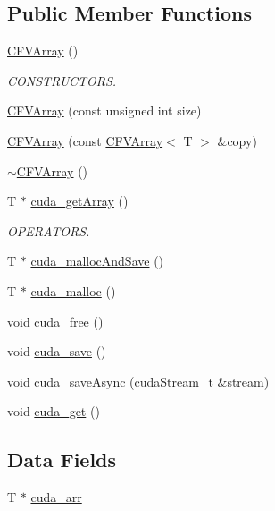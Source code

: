 \subsection*{Public Member Functions}
\begin{DoxyCompactItemize}
\item 
\hyperlink{classFVL_1_1CFVArray_af141a187a6f343f8f0acf258ee9428f5}{CFVArray} ()
\begin{DoxyCompactList}\small\item\em CONSTRUCTORS. \item\end{DoxyCompactList}\item 
\hyperlink{classFVL_1_1CFVArray_a4533252544513e80b44814b8afab3190}{CFVArray} (const unsigned int size)
\item 
\hyperlink{classFVL_1_1CFVArray_a2bfe813d44db8292ff5793db73fe7fe0}{CFVArray} (const \hyperlink{classFVL_1_1CFVArray}{CFVArray}$<$ T $>$ \&copy)
\item 
\hyperlink{classFVL_1_1CFVArray_a3c7cfa5d9c6793cd2866030b734b5987}{$\sim$CFVArray} ()
\item 
T $\ast$ \hyperlink{classFVL_1_1CFVArray_a79c842ffa963500e75bb49038b5a91cf}{cuda\_\-getArray} ()
\begin{DoxyCompactList}\small\item\em OPERATORS. \item\end{DoxyCompactList}\item 
T $\ast$ \hyperlink{classFVL_1_1CFVArray_a91b72217e89ae594799cf6f5d5e790fb}{cuda\_\-mallocAndSave} ()
\item 
T $\ast$ \hyperlink{classFVL_1_1CFVArray_ac5b54e1d7aacbc7ac8f947cc8403143e}{cuda\_\-malloc} ()
\item 
void \hyperlink{classFVL_1_1CFVArray_a7da37a3af0dbb3b115a980bf13d30d02}{cuda\_\-free} ()
\item 
void \hyperlink{classFVL_1_1CFVArray_af496393c6fc22710b80e2dcb735ccce7}{cuda\_\-save} ()
\item 
void \hyperlink{classFVL_1_1CFVArray_abde9b4b5738a7aeb95290249a3035ab5}{cuda\_\-saveAsync} (cudaStream\_\-t \&stream)
\item 
void \hyperlink{classFVL_1_1CFVArray_add025b0a8b98e7d4d6e631bbaf30b088}{cuda\_\-get} ()
\end{DoxyCompactItemize}
\subsection*{Data Fields}
\begin{DoxyCompactItemize}
\item 
T $\ast$ \hyperlink{classFVL_1_1CFVArray_ac7c2eda2752dff79215dfcc062d0d814}{cuda\_\-arr}
\end{DoxyCompactItemize}
